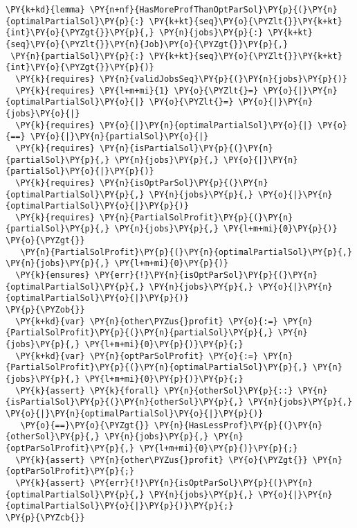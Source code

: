\begin{Verbatim}[commandchars=\\\{\},fontsize=\small]
\PY{k+kd}{lemma} \PY{n+nf}{HasMoreProfThanOptParSol}\PY{p}{(}\PY{n}{optimalPartialSol}\PY{p}{:} \PY{k+kt}{seq}\PY{o}{\PYZlt{}}\PY{k+kt}{int}\PY{o}{\PYZgt{}}\PY{p}{,} \PY{n}{jobs}\PY{p}{:} \PY{k+kt}{seq}\PY{o}{\PYZlt{}}\PY{n}{Job}\PY{o}{\PYZgt{}}\PY{p}{,}
 \PY{n}{partialSol}\PY{p}{:} \PY{k+kt}{seq}\PY{o}{\PYZlt{}}\PY{k+kt}{int}\PY{o}{\PYZgt{}}\PY{p}{)}
  \PY{k}{requires} \PY{n}{validJobsSeq}\PY{p}{(}\PY{n}{jobs}\PY{p}{)}
  \PY{k}{requires} \PY{l+m+mi}{1} \PY{o}{\PYZlt{}=} \PY{o}{|}\PY{n}{optimalPartialSol}\PY{o}{|} \PY{o}{\PYZlt{}=} \PY{o}{|}\PY{n}{jobs}\PY{o}{|}
  \PY{k}{requires} \PY{o}{|}\PY{n}{optimalPartialSol}\PY{o}{|} \PY{o}{==} \PY{o}{|}\PY{n}{partialSol}\PY{o}{|}
  \PY{k}{requires} \PY{n}{isPartialSol}\PY{p}{(}\PY{n}{partialSol}\PY{p}{,} \PY{n}{jobs}\PY{p}{,} \PY{o}{|}\PY{n}{partialSol}\PY{o}{|}\PY{p}{)}
  \PY{k}{requires} \PY{n}{isOptParSol}\PY{p}{(}\PY{n}{optimalPartialSol}\PY{p}{,} \PY{n}{jobs}\PY{p}{,} \PY{o}{|}\PY{n}{optimalPartialSol}\PY{o}{|}\PY{p}{)}
  \PY{k}{requires} \PY{n}{PartialSolProfit}\PY{p}{(}\PY{n}{partialSol}\PY{p}{,} \PY{n}{jobs}\PY{p}{,} \PY{l+m+mi}{0}\PY{p}{)} \PY{o}{\PYZgt{}}
   \PY{n}{PartialSolProfit}\PY{p}{(}\PY{n}{optimalPartialSol}\PY{p}{,} \PY{n}{jobs}\PY{p}{,} \PY{l+m+mi}{0}\PY{p}{)}
  \PY{k}{ensures} \PY{err}{!}\PY{n}{isOptParSol}\PY{p}{(}\PY{n}{optimalPartialSol}\PY{p}{,} \PY{n}{jobs}\PY{p}{,} \PY{o}{|}\PY{n}{optimalPartialSol}\PY{o}{|}\PY{p}{)}
\PY{p}{\PYZob{}}
  \PY{k+kd}{var} \PY{n}{other\PYZus{}profit} \PY{o}{:=} \PY{n}{PartialSolProfit}\PY{p}{(}\PY{n}{partialSol}\PY{p}{,} \PY{n}{jobs}\PY{p}{,} \PY{l+m+mi}{0}\PY{p}{)}\PY{p}{;}
  \PY{k+kd}{var} \PY{n}{optParSolProfit} \PY{o}{:=} \PY{n}{PartialSolProfit}\PY{p}{(}\PY{n}{optimalPartialSol}\PY{p}{,} \PY{n}{jobs}\PY{p}{,} \PY{l+m+mi}{0}\PY{p}{)}\PY{p}{;}
  \PY{k}{assert} \PY{k}{forall} \PY{n}{otherSol}\PY{p}{::} \PY{n}{isPartialSol}\PY{p}{(}\PY{n}{otherSol}\PY{p}{,} \PY{n}{jobs}\PY{p}{,} \PY{o}{|}\PY{n}{optimalPartialSol}\PY{o}{|}\PY{p}{)} 
   \PY{o}{==}\PY{o}{\PYZgt{}} \PY{n}{HasLessProf}\PY{p}{(}\PY{n}{otherSol}\PY{p}{,} \PY{n}{jobs}\PY{p}{,} \PY{n}{optParSolProfit}\PY{p}{,} \PY{l+m+mi}{0}\PY{p}{)}\PY{p}{;}
  \PY{k}{assert} \PY{n}{other\PYZus{}profit} \PY{o}{\PYZgt{}} \PY{n}{optParSolProfit}\PY{p}{;}
  \PY{k}{assert} \PY{err}{!}\PY{n}{isOptParSol}\PY{p}{(}\PY{n}{optimalPartialSol}\PY{p}{,} \PY{n}{jobs}\PY{p}{,} \PY{o}{|}\PY{n}{optimalPartialSol}\PY{o}{|}\PY{p}{)}\PY{p}{;}
\PY{p}{\PYZcb{}}
\end{Verbatim}


